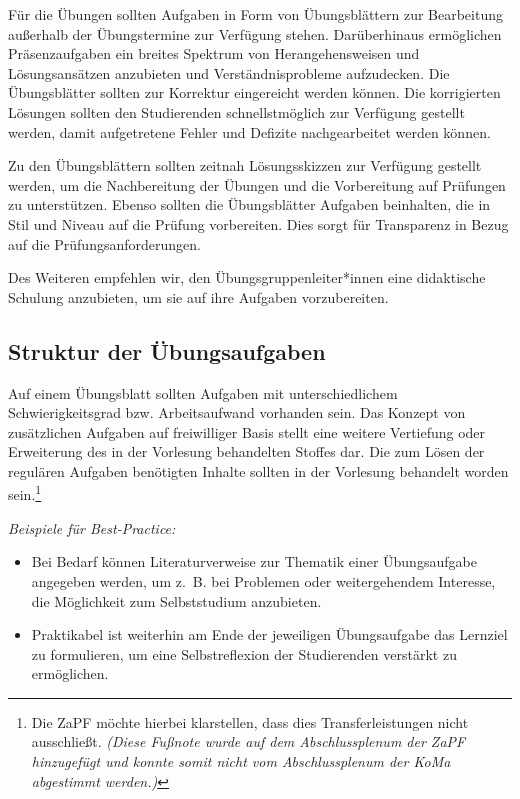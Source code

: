 \documentclass[DIV=calc]{scrartcl}
\begin{document}
Für die Übungen sollten Aufgaben in Form von Übungsblättern zur Bearbeitung außerhalb der Übungstermine zur Verfügung stehen. Darüberhinaus ermöglichen Präsenzaufgaben ein breites Spektrum von Herangehensweisen und Lösungsansätzen anzubieten und Verständnisprobleme aufzudecken.
Die Übungsblätter sollten zur Korrektur eingereicht werden können. Die korrigierten Lösungen sollten den Studierenden schnellstmöglich zur Verfügung gestellt werden, damit aufgetretene Fehler und Defizite nachgearbeitet werden können.

Zu den Übungsblättern sollten zeitnah Lösungsskizzen zur Verfügung gestellt werden, um die Nachbereitung der Übungen und die Vorbereitung auf Prüfungen zu unterstützen.
Ebenso sollten die Übungsblätter Aufgaben beinhalten, die in Stil und Niveau auf die Prüfung vorbereiten. Dies sorgt für Transparenz in Bezug auf die Prüfungsanforderungen.

Des Weiteren empfehlen wir, den Übungsgruppenleiter*innen eine didaktische Schulung anzubieten, um sie auf ihre Aufgaben vorzubereiten.

\subsection*{Struktur der Übungsaufgaben}
Auf einem Übungsblatt sollten Aufgaben mit unterschiedlichem Schwierigkeitsgrad bzw. Arbeitsaufwand vorhanden sein.
Das Konzept von zusätzlichen Aufgaben auf freiwilliger Basis stellt eine weitere Vertiefung oder Erweiterung des in der Vorlesung behandelten Stoffes dar. Die zum Lösen der regulären Aufgaben benötigten Inhalte sollten in der Vorlesung behandelt worden sein.\footnote{Die ZaPF möchte hierbei klarstellen, dass dies Transferleistungen nicht ausschließt. \textit{(Diese Fußnote wurde auf dem Abschlussplenum der ZaPF hinzugefügt und konnte somit nicht vom Abschlussplenum der KoMa abgestimmt werden.)}}

\emph{Beispiele für Best-Practice:}
\begin{itemize}
	\item Bei Bedarf können Literaturverweise zur Thematik einer Übungsaufgabe angegeben werden, um z.~B. bei Problemen oder weitergehendem Interesse, die Möglichkeit zum Selbststudium anzubieten.
	\item Praktikabel ist weiterhin am Ende der jeweiligen Übungsaufgabe das Lernziel zu formulieren, um eine Selbstreflexion der Studierenden verstärkt zu ermöglichen.
\end{itemize}
\end{document}
